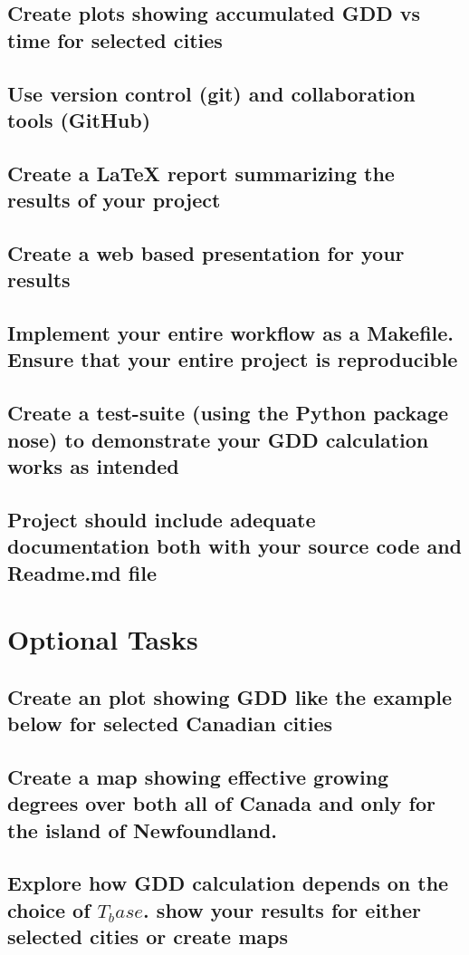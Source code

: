 \documentclass{article}
\begin{document}
\subsection{Create plots showing accumulated GDD vs time for selected cities}

\subsection{Use version control (git) and collaboration tools (GitHub)}
\subsection{Create a LaTeX report summarizing the results of your project}
\subsection{Create a web based presentation for your results}
\subsection{Implement your entire workflow as a Makefile. Ensure that your entire project is reproducible}
\subsection{Create a test-suite (using the Python package nose) to demonstrate your GDD calculation works as intended}
\subsection{Project should include adequate documentation both with your source code and Readme.md file}


\section{ \bf Optional Tasks}
\subsection{Create an plot showing GDD like the example below for selected Canadian cities}
\subsection{Create a map showing effective growing degrees over both all of Canada and only for the island of Newfoundland.}
\subsection{Explore how GDD calculation depends on the choice of $T_base$. show your results for either selected cities or create maps}
\end{document}

